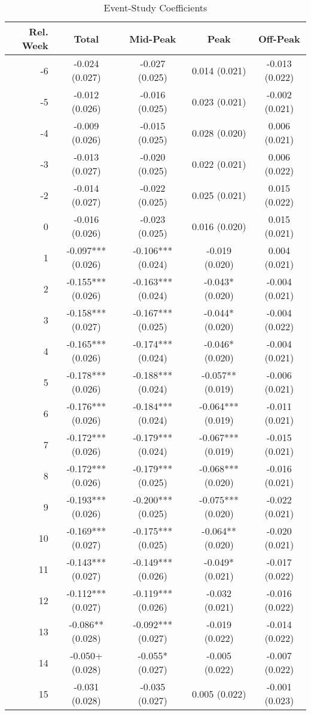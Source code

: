 \begin{table}[H]
\centering
\caption{Event-Study Coefficients}\label{tab:eventstudy_coefs}
\begin{tabular*}{\textwidth}{@{\extracolsep{\fill}}rcccc}
\toprule
Rel. Week & Total & Mid-Peak & Peak & Off-Peak
\\
\midrule
-6 & -0.024 (0.027) & -0.027 (0.025) & 0.014 (0.021) & -0.013 (0.022) \\
-5 & -0.012 (0.026) & -0.016 (0.025) & 0.023 (0.021) & -0.002 (0.021) \\
-4 & -0.009 (0.026) & -0.015 (0.025) & 0.028 (0.020) & 0.006 (0.021) \\
-3 & -0.013 (0.027) & -0.020 (0.025) & 0.022 (0.021) & 0.006 (0.022) \\
-2 & -0.014 (0.027) & -0.022 (0.025) & 0.025 (0.021) & 0.015 (0.022) \\
 0 & -0.016 (0.026) & -0.023 (0.025) & 0.016 (0.020) & 0.015 (0.021) \\
 1 & -0.097*** (0.026) & -0.106*** (0.024) & -0.019 (0.020) & 0.004 (0.021) \\
 2 & -0.155*** (0.026) & -0.163*** (0.024) & -0.043* (0.020) & -0.004 (0.021) \\
 3 & -0.158*** (0.027) & -0.167*** (0.025) & -0.044* (0.020) & -0.004 (0.022) \\
 4 & -0.165*** (0.026) & -0.174*** (0.024) & -0.046* (0.020) & -0.004 (0.021) \\
 5 & -0.178*** (0.026) & -0.188*** (0.024) & -0.057** (0.019) & -0.006 (0.021) \\
 6 & -0.176*** (0.026) & -0.184*** (0.024) & -0.064*** (0.019) & -0.011 (0.021) \\
 7 & -0.172*** (0.026) & -0.179*** (0.024) & -0.067*** (0.019) & -0.015 (0.021) \\
 8 & -0.172*** (0.026) & -0.179*** (0.025) & -0.068*** (0.020) & -0.016 (0.021) \\
 9 & -0.193*** (0.026) & -0.200*** (0.025) & -0.075*** (0.020) & -0.022 (0.021) \\
10 & -0.169*** (0.027) & -0.175*** (0.025) & -0.064** (0.020) & -0.020 (0.021) \\
11 & -0.143*** (0.027) & -0.149*** (0.026) & -0.049* (0.021) & -0.017 (0.022) \\
12 & -0.112*** (0.027) & -0.119*** (0.026) & -0.032 (0.021) & -0.016 (0.022) \\
13 & -0.086** (0.028) & -0.092*** (0.027) & -0.019 (0.022) & -0.014 (0.022) \\
14 & -0.050+ (0.028) & -0.055* (0.027) & -0.005 (0.022) & -0.007 (0.022) \\
15 & -0.031 (0.028) & -0.035 (0.027) & 0.005 (0.022) & -0.001 (0.023)
\bottomrule
\midrule
\multicolumn{5}{l}{\rule{0pt}{1em}+ p $<$ 0.1, * p $<$ 0.05, ** p $<$ 0.01, *** p $<$ 0.001}\\
\end{tabular*}
\end{table}
